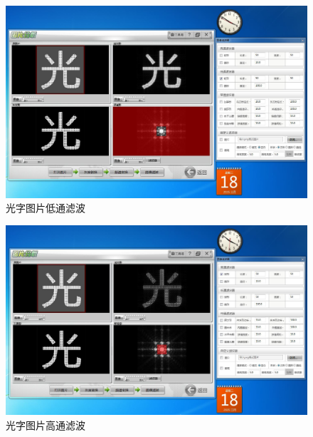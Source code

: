 \documentclass[11pt]{article}
\begin{document}
\begin{enumerate}
    \begin{figure}[H]
        \centering
        \includegraphics[width=15cm]{Fig/图19 光字图片低通滤波.JPG}
        \caption{光字图片低通滤波}
    \end{figure}
    \begin{figure}[H]
        \centering
        \includegraphics[width=15cm]{Fig/图20 光字图片高通滤波.JPG}
        \caption{光字图片高通滤波}
    \end{figure}


\end{enumerate}
\end{document}
